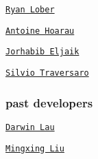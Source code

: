 \begin{DoxyItemize}
\item \href{https://github.com/rlober}{\tt Ryan Lober}
\item \href{https://github.com/ahoarau}{\tt Antoine Hoarau}
\item \href{https://github.com/jeljaik}{\tt Jorhabib Eljaik}
\item \href{https://github.com/traversaro}{\tt Silvio Traversaro}
\end{DoxyItemize}

\subsubsection*{past developers}


\begin{DoxyItemize}
\item \href{https://github.com/darwinlau}{\tt Darwin Lau}
\item \href{https://github.com/mingxing-liu}{\tt Mingxing Liu} 
\end{DoxyItemize}